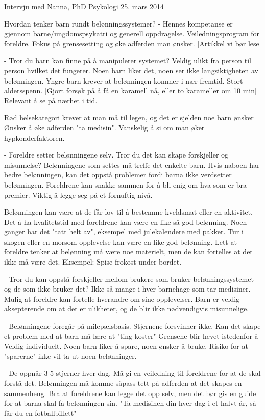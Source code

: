 Intervju med Nanna, PhD Psykologi 25. mars 2014

Hvordan tenker barn rundt belønningssystemer?
- 	Hennes kompetanse er gjennom barne/ungdomspsykatri og generell oppdragelse.
	Veiledningsprogram for foreldre. Fokus på grensesetting og øke adferden man ønsker.
	[Artikkel vi bør lese]

- Tror du barn kan finne på å manipulerer systemet?
	Veldig ulikt fra person til person hvilket det fungerer.
	Noen barn liker det, noen ser ikke langsiktigheten av belønningen.
	Yngre barn krever at belønningen kommer i nær fremtid.
	Stort aldersspenn. [Gjort forsøk på å få en karamell nå, eller to karameller om 10 min]
	Relevant å se på nærhet i tid.

	Rød helsekategori krever at man må til legen, og det er sjelden noe barn ønsker
	Ønsker å øke adferden "ta medisin". Vanskelig å si om man øker hypkonderfaktoren.


- Foreldre setter belønningene selv. Tror du det kan skape forskjeller og misunnelse?
	Belønningene som settes må treffe det enkelte barn.
	Hvis naboen har bedre belønningen, kan det oppstå problemer fordi barna ikke verdsetter belønningen.
	Foreldrene kan snakke sammen for å bli enig om hva som er bra premier.
	Viktig å legge seg på et fornuftig nivå. 


Belønningen kan være at de får lov til å bestemme kveldsmat eller en aktivitet. Det å ha kvalitetstid med foreldrene kan være en like så god belønning.
Noen ganger har det "tatt helt av", eksempel med julekalendere med pakker. 
Tur i skogen eller en morsom opplevelse kan være en like god belønning.
Lett at foreldre tenker at belønning må være noe materielt, men de kan fortelles at det ikke må være det.
Eksempel: Spise frokost under bordet.

- Tror du kan oppstå forskjeller mellom brukere som bruker belønningssystemet og de som ikke bruker det?
	Ikke så mange i hver barnehage som tar medisiner. 
	Mulig at foreldre kan fortelle hverandre om sine opplevelser.
	Barn er veldig aksepterende om at det er ulikheter, og de blir ikke nødvendigvis misunnelige. 


- Belønningene foregår på milepælsbasis. Stjernene forsvinner ikke. Kan det skape et problem med at barn må lære at "ting koster"
	Grensene blir hevet istedenfor å 
	Veldig individuelt. Noen barn liker å spare, noen ønsker å bruke. 
	Risiko for at "sparerne" ikke vil ta ut noen belønninger.


- De oppnår 3-5 stjerner hver dag.
	Må gi en veiledning til foreldrene for at de skal forstå det. 
	Belønningen må komme såpass tett på adferden at det skapes en sammenheng.
	Bra at foreldrene kan legge det opp selv, men det bør gis en guide for at barna skal få belønningen sin.
	"Ta medisinen din hver dag i et halvt år, så får du en fotballbillett"


